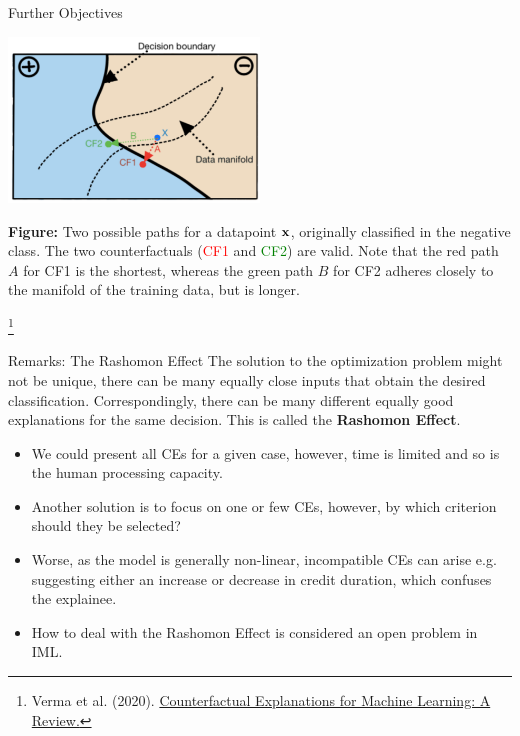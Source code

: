 \documentclass[11pt,compress,t,notes=noshow, xcolor=table]{beamer}
\begin{document}
\begin{vbframe}{Further Objectives}
	\begin{center}
		\includegraphics[width=0.5\textwidth]{figure/counterfactuals_obj}
	\end{center}

\scriptsize{\textbf{Figure:} Two possible paths for a datapoint \textcolor{blue}{$\xv$},
	originally classified in the negative class. The two counterfactuals (\textcolor{red}{CF1} and \textcolor{green}{CF2}) are valid. Note that the red path $A$ for CF1 is the shortest, whereas the
	green path $B$ for CF2 adheres closely to the manifold of the training data, but is longer.}
\vspace{0.3cm}


\footnote[frame]{Verma et al. (2020). \href{https://arxiv.org/pdf/2010.10596.pdf}{Counterfactual Explanations for Machine Learning: A Review.}}

\end{vbframe}

\begin{vbframe}{Remarks: The Rashomon Effect}
The solution to the optimization problem might not be unique, there can be many equally close inputs that obtain the desired classification. Correspondingly, there can be many different equally good explanations for the same decision. This is called the \textbf{Rashomon Effect}.
	\begin{itemize}
		\item We could present all CEs for a given case, however, time is limited and so is the human processing capacity.
		\item Another solution is to focus on one or few CEs, however, by which criterion should they be selected?
		\item Worse, as the model is generally non-linear, incompatible CEs can arise e.g. suggesting either an increase or decrease in credit duration, which confuses the explainee.
		\item How to deal with the Rashomon Effect is considered an open problem in IML.
	\end{itemize}
\end{vbframe}
\end{document}
